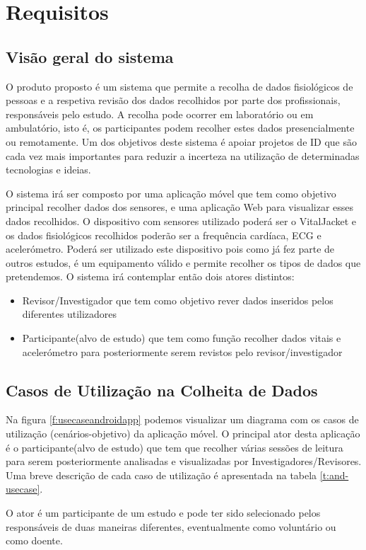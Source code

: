 \chapter{Requisitos}

\section{Visão geral do sistema}
O produto proposto é um sistema que permite a recolha de dados fisiológicos de pessoas e a respetiva revisão dos dados recolhidos por parte dos profissionais, responsáveis pelo estudo. A recolha pode ocorrer em laboratório ou em ambulatório, isto é, os participantes podem recolher estes dados presencialmente ou remotamente. Um dos objetivos deste sistema é apoiar projetos de \gls{ID} que são cada vez mais importantes para reduzir a incerteza na utilização de determinadas tecnologias e ideias.
\par 
O sistema irá ser composto por uma aplicação móvel que tem como objetivo principal recolher dados dos sensores, e uma aplicação Web para visualizar esses dados recolhidos. O dispositivo com sensores utilizado poderá ser o VitalJacket e os dados fisiológicos recolhidos poderão ser a frequência cardíaca, \gls{ECG} e acelerómetro. Poderá ser utilizado este dispositivo pois como já fez parte de outros estudos, é um equipamento válido e permite recolher os tipos de dados que pretendemos. O sistema irá contemplar então dois atores distintos:
\begin{itemize}
  \item Revisor/Investigador que tem como objetivo rever dados inseridos pelos diferentes utilizadores
  \item Participante(alvo de estudo) que tem como função recolher dados vitais e acelerómetro para posteriormente serem revistos pelo revisor/investigador
\end{itemize}
\newpage
\section{Casos de Utilização na Colheita de Dados}

Na figura \ref{f:usecaseandroidapp} podemos visualizar um diagrama com os casos de utilização (cenários-objetivo) da aplicação móvel. O principal ator desta aplicação é o participante(alvo de estudo) que tem que recolher várias sessões de leitura para serem posteriormente analisadas e visualizadas por Investigadores/Revisores.  Uma breve descrição de cada caso de utilização é apresentada na tabela \ref{t:and-usecase}.
\par
O ator é um participante de um estudo e pode ter sido selecionado pelos responsáveis de duas maneiras diferentes, eventualmente como voluntário ou como doente. 


